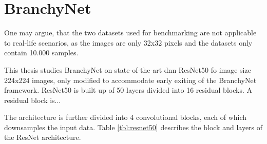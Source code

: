 \section{BranchyNet}


One may argue, that the two datasets used for benchmarking are not applicable to real-life scenarios, as the images are only 32x32 pixels and the datasets only contain 10.000 samples.



This thesis studies BranchyNet on state-of-the-art \gls{dnn} ResNet50 fo image size 224x224 images, only modified to accommodate early exiting of the BranchyNet framework. ResNet50 is built up of 50 layers divided into 16 residual blocks. A residual block is...


The architecture is further divided into 4 convolutional blocks, each of which downsamples the input data. Table \ref{tbl:resnet50} describes the block and layers of the ResNet architecture. 

